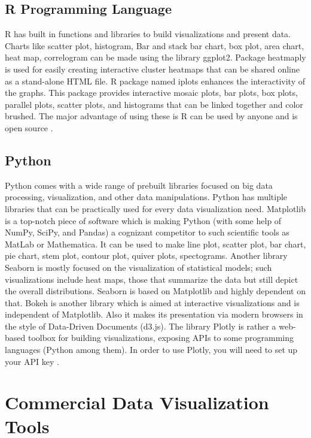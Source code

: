 \subsection*{R Programming Language }

R has built in functions and libraries to build visualizations and present data. Charts like scatter plot, histogram, Bar and stack bar chart, box plot, area chart, heat map, correlogram can be made using the library ggplot2. Package heatmaply is used for easily creating interactive cluster heatmaps that can be shared online as a stand-alone HTML file. R package named iplots enhances the interactivity of the graphs. This package provides interactive mosaic plots, bar plots, box plots, parallel plots, scatter plots, and histograms that can be linked together and color brushed. The major advantage of using these is R can be used by anyone and is open source \cite{R}.

\subsection*{Python}

Python comes with a wide range of prebuilt libraries focused on big data processing, visualization, and other data manipulations. Python has multiple libraries that can be practically used for every data visualization need. Matplotlib is a top-notch piece of software which is making Python (with some help of NumPy, SciPy, and Pandas) a cognizant competitor to such scientific tools as MatLab or Mathematica. It can be used to make line plot, scatter plot, bar chart, pie chart, stem plot, contour plot, quiver plots, spectograms. Another library Seaborn is mostly focused on the visualization of statistical models; such visualizations include heat maps, those that summarize the data but still depict the overall distributions. Seaborn is based on Matplotlib and highly dependent on that. Bokeh is another library which is aimed at interactive visualizations and is independent of Matplotlib. Also it makes its presentation via modern browsers in the style of Data-Driven Documents (d3.js). The library Plotly is rather a web-based toolbox for building visualizations, exposing APIs to some programming languages (Python among them). In order to use Plotly, you will need to set up your API key \cite{Python}. 

\section{Commercial Data Visualization Tools}


